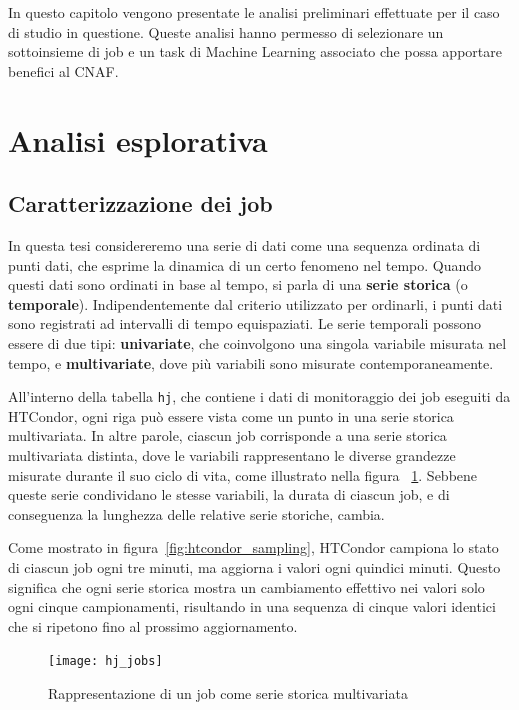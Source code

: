 \label{chap:analisi}

In questo capitolo vengono presentate le analisi preliminari effettuate per il
caso di studio in questione. Queste analisi hanno permesso di selezionare un
sottoinsieme di job e un task di Machine Learning associato che possa
apportare benefici al CNAF.

\section{Analisi esplorativa}

\subsection{Caratterizzazione dei job}
\label{sec:job_analysis}
In questa tesi considereremo una serie di dati come una sequenza ordinata di
punti dati, che esprime la dinamica di un certo fenomeno nel tempo. Quando
questi dati sono ordinati in base al tempo, si parla di una \textbf{serie
storica} (o \textbf{temporale}).
Indipendentemente dal criterio utilizzato per ordinarli, i punti dati sono
registrati ad intervalli di tempo equispaziati. Le serie temporali possono
essere di due tipi: \textbf{univariate}, che coinvolgono una singola variabile
misurata nel tempo, e \textbf{multivariate}, dove più variabili sono misurate
contemporaneamente.

All'interno della tabella \texttt{hj}, che contiene i dati di monitoraggio dei
job eseguiti da HTCondor, ogni riga può essere vista come un punto in una
serie storica multivariata. In altre parole, ciascun job corrisponde a una
serie storica multivariata distinta, dove le variabili rappresentano le
diverse grandezze misurate durante il suo ciclo di vita, come illustrato nella
figura~ \ref{fig:job_time_series}. Sebbene queste serie condividano le stesse
variabili, la durata di ciascun job, e di conseguenza la lunghezza delle
relative serie storiche, cambia.

Come mostrato in figura~\ref{fig:htcondor_sampling}, HTCondor campiona lo
stato di ciascun job ogni tre minuti, ma aggiorna i valori ogni quindici
minuti. Questo significa che ogni serie storica mostra un cambiamento
effettivo nei valori solo ogni cinque campionamenti, risultando in una
sequenza di cinque valori identici che si ripetono fino al prossimo
aggiornamento.

\begin{figure}[p]
    \centering 
    \texttt{[image: hj\_jobs]}
    \caption{\small Rappresentazione di un job come serie storica multivariata}
    \label{fig:job_time_series}
\end{figure}

